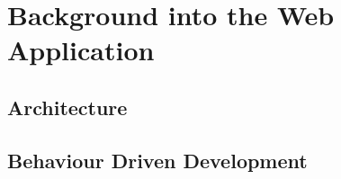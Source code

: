 \chapter{Background into the Web Application}

\section{Architecture}

\section{Behaviour Driven Development}



